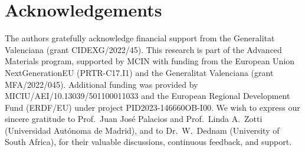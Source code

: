 \documentclass[preprint,12pt, a4paper]{elsarticle}
\begin{document}
\section*{Acknowledgements}
The authors gratefully acknowledge financial support from the Generalitat Valenciana (grant CIDEXG/2022/45). This research is part of the Advanced Materials program, supported by MCIN with funding from the European Union NextGenerationEU (PRTR-C17.I1) and the Generalitat Valenciana (grant MFA/2022/045). Additional funding was provided by MICIU/AEI/10.13039/501100011033 and the European Regional Development Fund (ERDF/EU) under project PID2023-146660OB-I00. We wish to express our sincere gratitude to Prof.\ Juan José Palacios and Prof.\ Linda A.\ Zotti (Universidad Autónoma de Madrid), and to Dr.\ W.\ Dednam (University of South Africa), for their valuable discussions, continuous feedback, and support.



\end{document}
